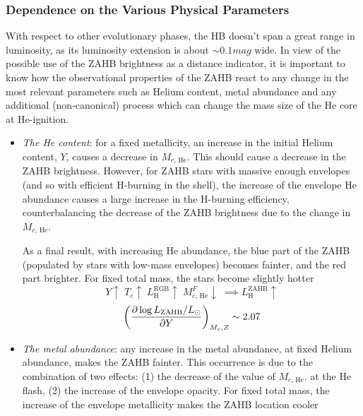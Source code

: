 \subsubsection{Dependence on the Various Physical Parameters}

With respect to other evolutionary phases, the HB doesn't span a great range in luminosity, as its luminosity extension is about $\sim 0.1\unit{mag}$ wide. In view of the possible use of the ZAHB brightness as a distance indicator, it is important to know how the observational properties of the ZAHB react to any change in the most relevant parameters such as Helium content, metal abundance and any additional (non-canonical) process which can change the mass size of the He core at He-ignition.
\begin{itemize}
    \item \emph{The He content}: for a fixed metallicity, an increase in the initial Helium content, $Y$, causes a decrease in $M_{c,\,\text{He}}$. This should cause a decrease in the ZAHB brightness. However, for ZAHB stars with massive enough envelopes (and so with efficient H-burning in the shell), the increase of the envelope He abundance causes a large increase in the H-burning efficiency, counterbalancing the decrease of the ZAHB brightness due to the change in $M_{c,\,\text{He}}$.
    \par As a final result, with increasing He abundance, the blue part of the ZAHB (populated by stars with low-mass envelopes) becomes fainter, and the red part brighter. For fixed total mass, the stars become slightly hotter
        \begin{equation*}
            Y\uparrow\;T_{c}\uparrow\;L_{\text{H}}^{\text{RGB}}\uparrow\;M_{c,\,\text{He}}^{F}\downarrow\; \implies L_{\text{H}}^{\text{ZAHB}}\uparrow
        \end{equation*}
        \begin{equation*}
            \left(\frac{\partial \log L_{\text{ZAHB}}/L_{\odot}}{\partial Y}\right)_{M_{c}, Z} \sim 2.07
        \end{equation*}
    \item \emph{The metal abundance}: any increase in the metal abundance, at fixed Helium abundance, makes the ZAHB fainter. This occurrence is due to the combination of two effects: (1) the decrease of the value of $M_{c,\,\text{He}}$. at the He flash, (2) the increase of the envelope opacity. For fixed total mass, the increase of the envelope metallicity makes the ZAHB location cooler
        \begin{equation*}

\end{equation*}
\end{itemize}

